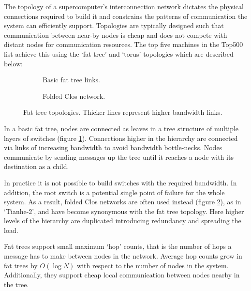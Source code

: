 				The topology of a supercomputer's interconnection network dictates the
				physical connections required to build it and constrains the patterns of
				communication the system can efficiently support. Topologies are
				typically designed such that communication between near-by nodes is
				cheap and does not compete with distant nodes for communication
				resources. The top five machines in the Top500 list achieve this using
				the `fat tree' and `torus' topologies which are described below:
				
				\begin{figure}
					\begin{subfigure}[t]{\textwidth}
						\center
						
						\caption{Basic fat tree links.}
						\label{fig:fat-tree-concept}
					\end{subfigure}
					
					\vspace{1.5em}
					
					\begin{subfigure}[t]{\textwidth}
						\center
						
						\caption{Folded Clos network.}
						\label{fig:fat-tree-closs}
					\end{subfigure}
					
					\caption[Fat tree topologies.]{Fat tree topologies. Thicker lines
					represent higher bandwidth links.}
					\label{fig:fat-tree}
				\end{figure}
				
				\label{sec:fat-tree}
				
				In a basic fat tree, nodes are connected as leaves in a tree structure
				of multiple layers of switches (figure \ref{fig:fat-tree-concept}).
				Connections higher in the hierarchy are connected via links of
				increasing bandwidth to avoid bandwidth bottle-necks.  Nodes communicate
				by sending messages up the tree until it reaches a node with its
				destination as a child.
				
				In practice it is not possible to build switches with the required
				bandwidth. In addition, the root switch is a potential single point of
				failure for the whole system. As a result, folded Clos networks are
				often used instead (figure \ref{fig:fat-tree-closs}), as in `Tianhe-2',
				and have become synonymous with the fat tree topology. Here higher
				levels of the hierarchy are duplicated introducing redundancy and
				spreading the load.
				
				Fat trees support small maximum `hop' counts, that is the number of hops
				a message has to make between nodes in the network. Average hop counts
				grow in fat trees by $O(\log{N})$ with respect to the number of nodes in
				the system. Additionally, they support cheap local communication between
				nodes nearby in the tree.
				
